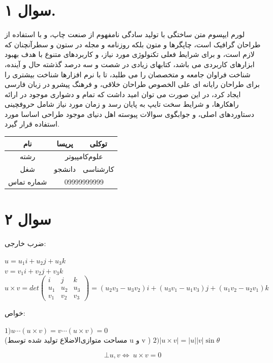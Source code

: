 \documentclass[]{article}
\begin{document}
\section*{سوال ۱.}
لورم ایپسوم متن ساختگی با تولید سادگی نامفهوم از صنعت چاپ، و با استفاده از طراحان گرافیک است، چاپگرها و متون بلکه روزنامه و مجله در ستون و سطرآنچنان که لازم است، و برای شرایط فعلی تکنولوژی مورد نیاز، و کاربردهای متنوع با هدف بهبود ابزارهای کاربردی می باشد، کتابهای زیادی در شصت و سه درصد گذشته حال و آینده، شناخت فراوان جامعه و متخصصان را می طلبد، تا با نرم افزارها شناخت بیشتری را برای طراحان رایانه ای علی الخصوص طراحان خلاقی، و فرهنگ پیشرو در زبان فارسی ایجاد کرد، در این صورت می توان امید داشت که تمام و دشواری موجود در ارائه راهکارها، و شرایط سخت تایپ به پایان رسد و زمان مورد نیاز شامل حروفچینی دستاوردهای اصلی، و جوابگوی سوالات پیوسته اهل دنیای موجود طراحی اساسا مورد استفاده قرار گیرد.
  \begin{center}
    \begin{tabular}{|c|c|c|}
    \hline
         نام & پریسا & توکلی \\
    \hline

رشته &
\multicolumn{2}{|c|}{علوم‌کامپیوتر}
\\
\hline
         شغل & دانشجو & کارشناسی \\
    \hline 
    
    شماره تماس &
\multicolumn{2}{|c|}{09999999999}
\\
\hline
    
    \end{tabular}
  \end{center}
\begin{center}
\end{center}
\section*{سوال ۲}
ضرب خارجی:\\
\begin{flushleft}
$
u = u_1i + u_2j+u_3k $
\\
$
v = v_1i + v_2j +v_3k
$
\\
$
u \times v = det 
\begin{pmatrix}
i & j & k\\
u_1& u_2 & u_3\\
v_1 & v_2 & v_3
\end{pmatrix} = 
(u_2v_3 - u_3v_2)i + (u_3v_1 - u_1v_3)j + (u_1v_2 - u_2v_1)k
$
\\
\end{flushleft}
خواص:
\begin{flushleft}
$ 
1) u \cdots (u \times v) = v \cdots (u \times v) = 0 $
\\

(مساحت متوازی‌الاضلاع تولید شده توسط u و v )
$
2) \lvert u \times v \rvert = |u||v| \sin \theta 
$

\[\bot u ,  v  \iff \ u \times v = 0 \]
\end{flushleft}
\end{document}
